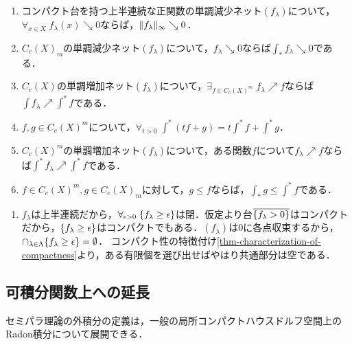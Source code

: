 \documentclass[uplatex,dvipdfmx]{jsreport}
\begin{document}
\begin{lemma}\mbox{}
    \begin{enumerate}
        \item コンパクト台を持つ上半連続な正関数の単調減少ネット$(f_\lambda)$について，$\forall_{x\in X}\;f_\lambda(x)\searrow 0$ならば，$\|f_\lambda\|_\infty\searrow0$．
        \item $C_c(X)_m$の単調減少ネット$(f_\lambda)$について，$f_\lambda\searrow0$ならば$\int_*f_\lambda\searrow0$である．
        \item $C_c(X)$の単調増加ネット$(f_\lambda)$について，$\exists_{f\in C_c(X)^m}\;f_\lambda\nearrow f$ならば$\int f_\lambda\nearrow\int^*f$である．
        \item $f,g\in C_c(X)^m$について，$\forall_{t>0}\;\int^*(tf+g)=t\int^*f+\int^*g$．
        \item $C_c(X)^m$の単調増加ネット$(f_\lambda)$について，ある関数$f$について$f_\lambda\nearrow f$ならば$\int^*f_\lambda\nearrow\int^*f$である．
        \item $f\in C_c(X)^m,g\in C_c(X)_m$に対して，$g\le f$ならば，$\int_*g\le\int^*f$である．
    \end{enumerate}
\end{lemma}
\begin{Proof}\mbox{}
    \begin{enumerate}
        \item $f_\lambda$は上半連続だから，$\forall_{\epsilon>0}\;\{f_\lambda\ge\epsilon\}$は閉．仮定より台$\overline{\left\{f_\lambda>0\right\}}$はコンパクトだから，$\{f_\lambda\ge\epsilon\}$はコンパクトでもある．$(f_\lambda)$は$0$に各点収束するから，$\cap_{\lambda\in\Lambda}\{f_\lambda\ge\epsilon\}=\emptyset$．
        コンパクト性の特徴付け\ref{thm-characterization-of-compactness}より，ある有限個を選び出せばやはり共通部分は空である．
    \end{enumerate}
\end{Proof}

\subsection{可積分関数上への延長}

\begin{tcolorbox}[colframe=ForestGreen, colback=ForestGreen!10!white,breakable,colbacktitle=ForestGreen!40!white,coltitle=black,fonttitle=\bfseries\sffamily,
title=]
    セミパラ理論の外積分の定義は，一般の局所コンパクトハウスドルフ空間上のRadon積分について展開できる．
\end{tcolorbox}
\end{document}

